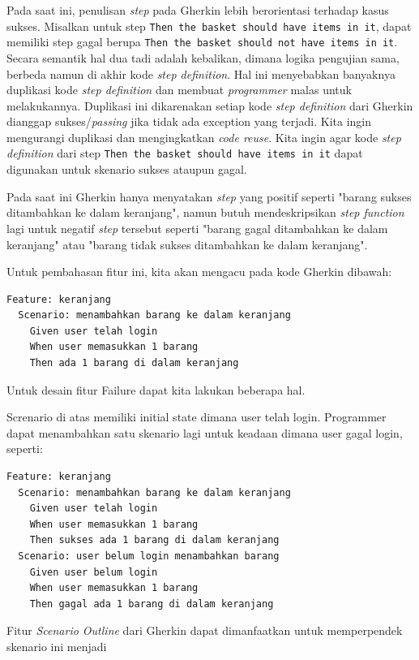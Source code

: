 Pada saat ini, penulisan \emph{step} pada Gherkin lebih berorientasi terhadap
kasus sukses. Misalkan untuk step \texttt{Then the basket should have items in it},
dapat memiliki step gagal berupa \texttt{Then the basket should not have items in it}.
Secara semantik hal dua tadi adalah kebalikan, dimana logika pengujian
sama, berbeda namun di akhir kode \emph{step definition}. Hal ini
menyebabkan banyaknya duplikasi kode \emph{step definition} dan membuat \emph{programmer} malas untuk
melakukannya.
Duplikasi ini dikarenakan setiap kode \emph{step definition} dari Gherkin dianggap
sukses/\emph{passing} jika tidak ada exception yang terjadi.
Kita ingin mengurangi duplikasi dan mengingkatkan \emph{code reuse}.
Kita ingin agar kode \emph{step definition} dari step \texttt{Then the basket should have items in it}
dapat digunakan untuk skenario sukses ataupun gagal.

Pada saat ini Gherkin hanya menyatakan \textit{step} yang positif seperti
"barang sukses ditambahkan ke dalam keranjang", namun butuh mendeskripsikan \textit{step function}
lagi untuk negatif \textit{step} tersebut seperti "barang gagal ditambahkan ke dalam keranjang" atau
"barang tidak sukses ditambahkan ke dalam keranjang".

Untuk pembahasan fitur ini, kita akan mengacu pada kode Gherkin dibawah:
\begin{lstlisting}[language=gherkin]
Feature: keranjang
  Scenario: menambahkan barang ke dalam keranjang
    Given user telah login
    When user memasukkan 1 barang
    Then ada 1 barang di dalam keranjang
\end{lstlisting}

Untuk desain fitur Failure dapat kita lakukan beberapa hal.

Screnario di atas memiliki initial state dimana user telah login.
Programmer dapat menambahkan satu skenario lagi untuk keadaan dimana user gagal login, seperti:
\begin{lstlisting}[language=gherkin]
Feature: keranjang
  Scenario: menambahkan barang ke dalam keranjang
    Given user telah login
    When user memasukkan 1 barang
    Then sukses ada 1 barang di dalam keranjang
  Scenario: user belum login menambahkan barang 
    Given user belum login
    When user memasukkan 1 barang
    Then gagal ada 1 barang di dalam keranjang
\end{lstlisting}

Fitur \textit{Scenario Outline} dari Gherkin dapat dimanfaatkan untuk memperpendek skenario ini menjadi

